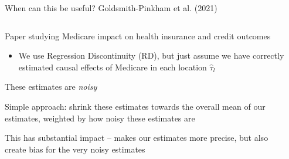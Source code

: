 \documentclass[notes,11pt, aspectratio=169]{beamer}
\newenvironment{wideitemize}{\itemize\addtolength{\itemsep}{10pt}}{\enditemize}
\begin{document}
\begin{frame}{When can this be useful? Goldsmith-Pinkham et al. (2021)}
  \begin{columns}[T] %
    \begin{column}{.5\textwidth}
  \begin{wideitemize}
  \item<1-> Paper studying Medicare impact on health insurance and credit outcomes
    \begin{itemize}
    \item We use Regression Discontinuity (RD), but just assume we
      have correctly estimated causal effects of Medicare in each
      location $\hat{\tau}_{l}$
    \end{itemize}
  \item<1-> These estimates are \emph{noisy}
  \item<2-> Simple approach: shrink these estimates towards the overall
    mean of our estimates, weighted by how noisy these estimates are
  \item<3-> This has substantial impact -- makes our estimates more precise, but also create bias for the very noisy estimates    
  \end{wideitemize}
\end{column}
\begin{column}{0.5\textwidth}

\end{column}
\end{columns}
\end{frame}
\end{document}
